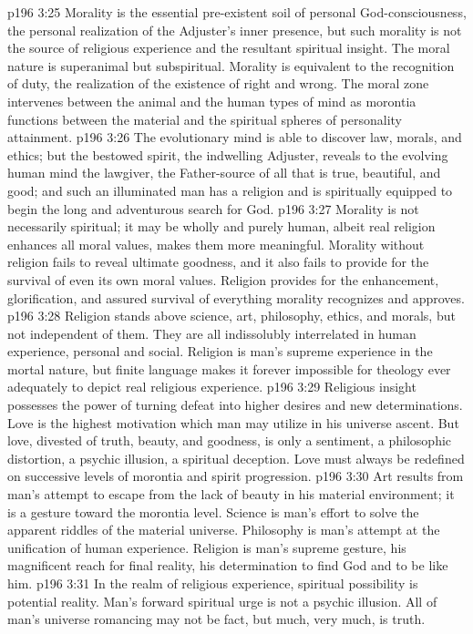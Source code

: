 \vs p196 3:25 Morality is the essential pre\hyp{}existent soil of personal God\hyp{}consciousness, the personal realization of the Adjuster’s inner presence, but such morality is not the source of religious experience and the resultant spiritual insight. The moral nature is superanimal but subspiritual. Morality is equivalent to the recognition of duty, the realization of the existence of right and wrong. The moral zone intervenes between the animal and the human types of mind as morontia functions between the material and the spiritual spheres of personality attainment.
\vs p196 3:26 The evolutionary mind is able to discover law, morals, and ethics; but the bestowed spirit, the indwelling Adjuster, reveals to the evolving human mind the lawgiver, the Father\hyp{}source of all that is true, beautiful, and good; and such an illuminated man has a religion and is spiritually equipped to begin the long and adventurous search for God.
\vs p196 3:27 Morality is not necessarily spiritual; it may be wholly and purely human, albeit real religion enhances all moral values, makes them more meaningful. Morality without religion fails to reveal ultimate goodness, and it also fails to provide for the survival of even its own moral values. Religion provides for the enhancement, glorification, and assured survival of everything morality recognizes and approves.
\vs p196 3:28 Religion stands above science, art, philosophy, ethics, and morals, but not independent of them. They are all indissolubly interrelated in human experience, personal and social. Religion is man’s supreme experience in the mortal nature, but finite language makes it forever impossible for theology ever adequately to depict real religious experience.
\vs p196 3:29 \pc Religious insight possesses the power of turning defeat into higher desires and new determinations. Love is the highest motivation which man may utilize in his universe ascent. But love, divested of truth, beauty, and goodness, is only a sentiment, a philosophic distortion, a psychic illusion, a spiritual deception. Love must always be redefined on successive levels of morontia and spirit progression.
\vs p196 3:30 \pc Art results from man’s attempt to escape from the lack of beauty in his material environment; it is a gesture toward the morontia level. Science is man’s effort to solve the apparent riddles of the material universe. Philosophy is man’s attempt at the unification of human experience. Religion is man’s supreme gesture, his magnificent reach for final reality, his determination to find God and to be like him.
\vs p196 3:31 \pc In the realm of religious experience, spiritual possibility is potential reality. Man’s forward spiritual urge is not a psychic illusion. All of man’s universe romancing may not be fact, but much, very much, is truth.
